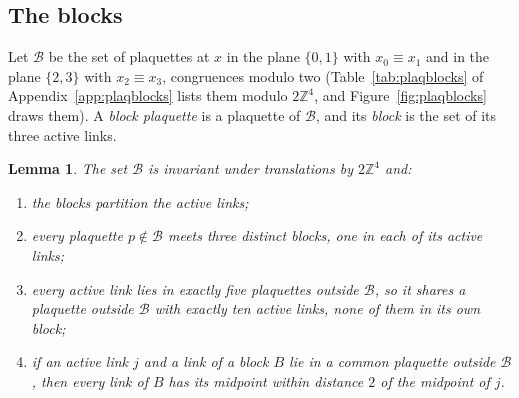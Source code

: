 \documentclass[11pt]{amsart}
\newtheorem{lemma}[theorem]{Lemma}
\theoremstyle{definition}
\theoremstyle{remark}
\numberwithin{equation}{section}
\newcommand{\Z}{\mathbb{Z}}
\begin{document}
\subsection{The blocks}

Let $\mathcal B$ be the set of plaquettes at $x$ in the plane $\{0,1\}$ with
$x_0\equiv x_1$ and in the plane $\{2,3\}$ with $x_2\equiv x_3$, congruences
modulo two (Table~\ref{tab:plaqblocks} of Appendix~\ref{app:plaqblocks} lists
them modulo $2\Z^4$, and Figure~\ref{fig:plaqblocks} draws them). A
\emph{block plaquette} is a plaquette of $\mathcal B$, and its \emph{block}
is the set of its three active links.

\begin{lemma}\label{lem:plaqblocks}
The set $\mathcal B$ is invariant under translations by $2\Z^4$ and:
\begin{enumerate}[label=\textup{(\roman*)},leftmargin=*]
\item the blocks partition the active links;
\item every plaquette $p\notin\mathcal B$ meets three distinct blocks, one in
each of its active links;
\item every active link lies in exactly five plaquettes outside $\mathcal B$,
so it shares a plaquette outside $\mathcal B$ with exactly ten active links,
none of them in its own block;
\item if an active link $j$ and a link of a block $B$ lie in a common
plaquette outside $\mathcal B$, then every link of $B$ has its midpoint
within distance $2$ of the midpoint of $j$.
\end{enumerate}
\end{lemma}
\end{document}

